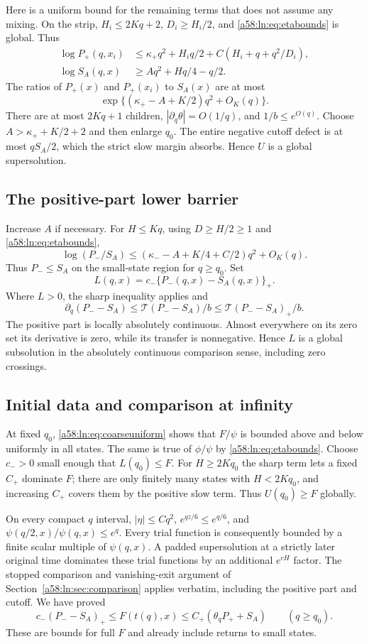 \documentclass[11pt,letterpaper]{article}
\theoremstyle{remark}
\newcommand{\TT}{\mathcal T}
\begin{document}
Here is a uniform bound for the remaining terms that does not assume
any mixing. On the strip, $H_i\le2Kq+2$, $D_i\ge H_i/2$, and
\eqref{a58:ln:eq:etabounds} is global. Thus
\begin{align*}
 \log P_+(q,x_i)&\le\kappa_+q^2+H_iq/2
                       +C(H_i+q+q^2/D_i),\\
 \log S_A(q,x)&\ge Aq^2+Hq/4-q/2.
\end{align*}
The ratios of $P_+(x)$ and $P_+(x_i)$ to $S_A(x)$ are at most
\[
 \exp\{(\kappa_+-A+K/2)q^2+O_K(q)\}.
\]
There are at most $2Kq+1$ children,
$|\partial_q\theta|=O(1/q)$, and $1/b\le e^{O(q)}$.
Choose $A>\kappa_++K/2+2$ and then enlarge $q_0$.
The entire negative cutoff defect is at most $qS_A/2$, which the strict
slow margin absorbs. Hence $U$ is a global supersolution.

\subsection{The positive-part lower barrier}
Increase $A$ if necessary. For $H\le Kq$, using $D\ge H/2\ge1$ and
\eqref{a58:ln:eq:etabounds},
\[
 \log(P_-/S_A)
 \le(\kappa_--A+K/4+C/2)q^2+O_K(q).
\]
Thus $P_-\le S_A$ on the small-state region for $q\ge q_0$.
Set
\[
 L(q,x)=c_-\{P_-(q,x)-S_A(q,x)\}_+.
\]
Where $L>0$, the sharp inequality applies and
\[
 \partial_q(P_--S_A)\le\TT(P_--S_A)/b
                         \le\TT(P_--S_A)_+/b.
\]
The positive part is locally absolutely continuous. Almost everywhere
on its zero set its derivative is zero, while its transfer is
nonnegative. Hence $L$ is a global subsolution in the absolutely
continuous comparison sense, including zero crossings.

\subsection{Initial data and comparison at infinity}
At fixed $q_0$, \eqref{a58:ln:eq:coarseuniform} shows that $F/\psi$ is bounded
above and below uniformly in all states. The same is true of $\phi/\psi$
by \eqref{a58:ln:eq:etabounds}. Choose $c_->0$ small enough that $L(q_0)\le F$.
For $H\ge2Kq_0$ the sharp term lets a fixed $C_+$ dominate $F$;
there are only finitely many states with $H<2Kq_0$, and increasing $C_+$
covers them by the positive slow term. Thus $U(q_0)\ge F$ globally.

On every compact $q$ interval, $|\eta|\le Cq^2$,
$e^{qz/6}\le e^{q/6}$, and
$\psi(q/2,x)/\psi(q,x)\le e^q$. Every trial function is consequently
bounded by a finite scalar multiple of $\psi(q,x)$. A padded
supersolution at a strictly later original time dominates these trial
functions by an additional $e^{cH}$ factor. The stopped comparison and
vanishing-exit argument of Section~\ref{a58:ln:sec:comparison} applies verbatim,
including the positive part and cutoff. We have proved
\begin{equation}\label{a58:ln:eq:globalbarriers}
 c_-(P_--S_A)_+\le F(t(q),x)
 \le C_+(\theta_qP_++S_A)\qquad(q\ge q_0).
\end{equation}
These are bounds for full $F$ and already include returns to small states.
\end{document}
